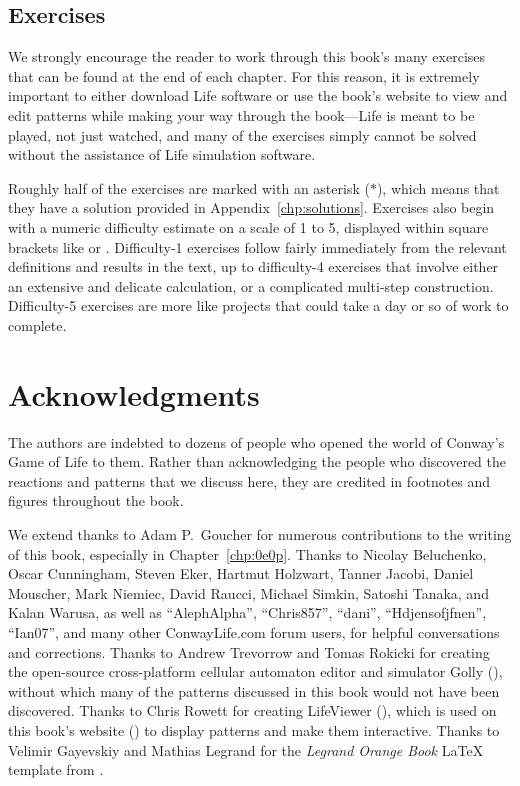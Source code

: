 \subsection*{Exercises}

We strongly encourage the reader to work through this book's many exercises that can be found at the end of each chapter. For this reason, it is extremely important to either download Life software or use the book's website to view and edit patterns while making your way through the book---Life is meant to be played, not just watched, and many of the exercises simply cannot be solved without the assistance of Life simulation software.

Roughly half of the exercises are marked with an asterisk ($\ast$), which means that they have a solution provided in Appendix~\ref{chp:solutions}. Exercises also begin with a numeric difficulty estimate on a scale of 1 to 5, displayed within square brackets like  or . Difficulty-1 exercises follow fairly immediately from the relevant definitions and results in the text, up to difficulty-4 exercises that involve either an extensive and delicate calculation, or a complicated multi-step construction. Difficulty-5 exercises are more like projects that could take a day or so of work to complete.


\section*{Acknowledgments}

The authors are indebted to dozens of people who opened the world of Conway's Game of Life to them. Rather than acknowledging the people who discovered the reactions and patterns that we discuss here, they are credited in footnotes and figures throughout the book.

We extend thanks to Adam P.~Goucher for numerous contributions to the writing of this book, especially in Chapter~\ref{chp:0e0p}. Thanks to Nicolay Beluchenko, Oscar Cunningham, Steven Eker, Hartmut Holzwart, Tanner Jacobi, Daniel Mouscher, Mark Niemiec, David Raucci, Michael Simkin, Satoshi Tanaka, and Kalan Warusa, as well as ``AlephAlpha'', ``Chris857'', ``dani'', ``Hdjensofjfnen'', ``Ian07'', and many other ConwayLife.com forum users, for helpful conversations and corrections. Thanks to Andrew Trevorrow and Tomas Rokicki for creating the open-source cross-platform cellular automaton editor and simulator Golly (), without which many of the patterns discussed in this book would not have been discovered. Thanks to Chris Rowett for creating LifeViewer (), which is used on this book's website () to display patterns and make them interactive. Thanks to Velimir Gayevskiy and Mathias Legrand for the \emph{Legrand Orange Book} LaTeX template from .

